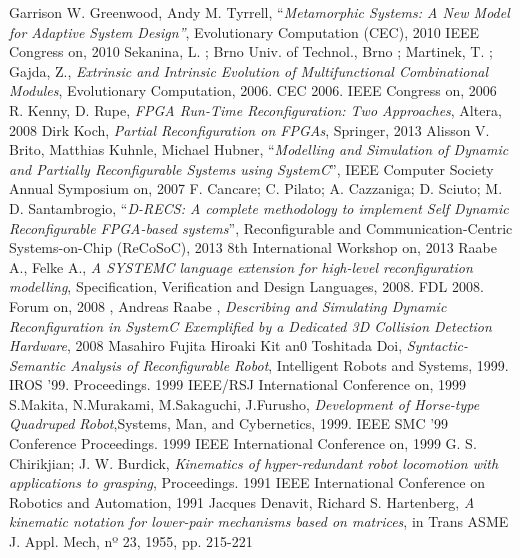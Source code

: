 \documentclass[a4paper,titlepage]{book}
\begin{document}
\begin{thebibliography}{1}

 Garrison W. Greenwood, Andy M. Tyrrell, ``\textit{Metamorphic Systems: A New Model for Adaptive System Design''}, Evolutionary Computation (CEC), 2010 IEEE Congress on, 2010
 Sekanina, L. ; Brno Univ. of Technol., Brno ; Martinek, T. ; Gajda, Z., \textit{Extrinsic and Intrinsic Evolution of Multifunctional Combinational Modules}, Evolutionary Computation, 2006. CEC 2006. IEEE Congress on, 2006
 R. Kenny, D. Rupe, \textit{FPGA Run-Time Reconfiguration: Two Approaches}, Altera, 2008
 Dirk Koch, \textit{Partial Reconfiguration on FPGAs}, Springer, 2013
Alisson V. Brito, Matthias Kuhnle, Michael Hubner, ``\textit{Modelling and Simulation of Dynamic and Partially Reconfigurable Systems using SystemC}'', IEEE Computer Society Annual Symposium on, 2007
 F. Cancare;  C. Pilato;   A. Cazzaniga;  D. Sciuto;  M. D. Santambrogio, ``\textit{D-RECS: A complete methodology to implement Self Dynamic Reconfigurable FPGA-based systems}'', Reconfigurable and Communication-Centric Systems-on-Chip (ReCoSoC), 2013 8th International Workshop on, 2013
 Raabe A., Felke A., \textit{A SYSTEMC language extension for high-level reconfiguration modelling}, Specification, Verification and Design Languages, 2008. FDL 2008. Forum on, 2008
 , Andreas Raabe , \textit{Describing and Simulating Dynamic Reconfiguration in SystemC Exemplified by a Dedicated 3D Collision Detection Hardware}, 2008
 Masahiro Fujita Hiroaki Kit an0 Toshitada Doi, \textit{Syntactic-Semantic Analysis of Reconfigurable Robot}, Intelligent Robots and Systems, 1999. IROS '99. Proceedings. 1999 IEEE/RSJ International Conference on, 1999
 S.Makita, N.Murakami, M.Sakaguchi, J.Furusho, \textit{Development of Horse-type Quadruped Robot},Systems, Man, and Cybernetics, 1999. IEEE SMC '99 Conference Proceedings. 1999 IEEE International Conference on, 1999
 G. S. Chirikjian; J. W. Burdick, \textit{Kinematics of hyper-redundant robot locomotion with applications to grasping}, Proceedings. 1991 IEEE International Conference on Robotics and Automation, 1991
 Jacques Denavit, Richard S. Hartenberg, \textit{A kinematic notation for lower-pair mechanisms based on matrices}, in Trans ASME J. Appl. Mech, nº 23, 1955, pp. 215-221

\end{thebibliography}

\end{document}
